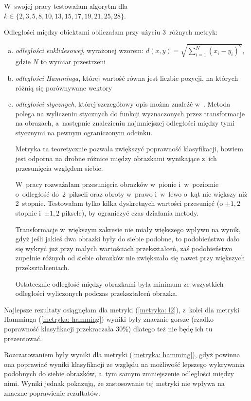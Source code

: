 \documentclass[12pt]{article}
\begin{document}
W~swojej pracy testowałam algorytm dla $k \in \{2,3,5,8,10,13, 15, 17, 19, 21, 25, 28\}$. 

Odległości między obiektami obliczałam przy użyciu 3~różnych metryk:
\begin{enumerate}[(a)]
 \item\label{metryka: l2} \emph{odległości euklidesowej}, wyrażonej wzorem: $d(x,y) = \sqrt{\sum_{i=1}^{N}(x_i - y_i)^2}$, gdzie $N$ to wymiar przestrzeni
 \item\label{metryka: hamming} \emph{odległości Hamminga}, której wartość równa jest liczbie pozycji, na których różnią się porównywane wektory
 \item\label{metryka: tangent} \emph{odległości stycznych}, której szczegółowy opis można znaleźć w~\cite{tangent distance}. Metoda polega na wyliczeniu stycznych do funkcji wyznaczonych przez transformacje na obrazach, a~następnie 
znalezieniu najmniejszej odległości między tymi stycznymi na pewnym ograniczonym odcinku.

Metryka ta teoretycznie pozwala zwiększyć poprawność klasyfikacji, bowiem jest odporna na drobne różnice między obrazkami wynikające z~ich przesunięcia względem siebie.

W~pracy rozważałam przesunięcia obrazków w~pionie i~w~poziomie o~odległość do~2~pikseli oraz obroty w~prawo i~w~lewo o~kąt nie większy niż 2~stopnie. Testowałam tylko kilka
dyskretnych wartości przesunięć (o $\pm 1,2$ stopnie i~$\pm 1,2$ piksele), by ograniczyć czas działania metody.

Transformacje w~większym zakresie
nie miały większego wpływu na wynik, gdyż jeśli jakieś dwa obrazki były do siebie podobne, to podobieństwo dało się wykryć już przy małych
wartościach przekształceń, zaś podobieństwo zupełnie różnych od siebie obrazków nie zwiększało się nawet przy większych przekształceniach.

Ostatecznie odległość między obrazkami była minimum ze wszystkich odległości wyliczonych podczas przekształceń obrazka.

\end{enumerate}

Najlepsze rezultaty osiągnęłam dla metryki (\ref{metryka: l2}), z~kolei dla metryki Hamminga (\ref{metryka: hamming}) wyniki były znacznie gorsze 
(rzadko poprawność klasyfikacji przekraczała 30\%) dlatego też nie będę ich tu prezentować.

Rozczarowaniem były wyniki dla metryki (\ref{metryka: hamming}), gdyż powinna ona poprawiać wyniki klasyfikacji ze względu na możliwość lepszego 
wykrywania podobnych do siebie obrazków, a~tym samym zmniejszenie odległości między nimi. Wyniki jednak pokazują, że zastosowanie tej metryki nie wpływa na znaczne poprawienie rezultatów.
\end{document}

